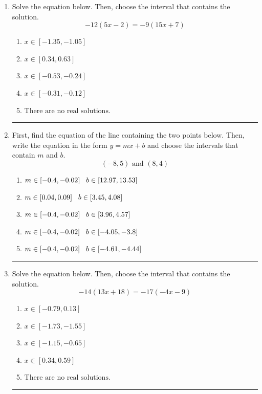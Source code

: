 \documentclass[14pt]{extbook}
\newcommand{\litem}[1]{\item#1\hspace*{-1cm}\rule{\textwidth}{0.4pt}}
\begin{document}
\begin{enumerate}
{\begin{enumerate}[label=\Alph*.]
\end{enumerate} }
\litem{
Solve the equation below. Then, choose the interval that contains the solution.\[ -12(5x -2) = -9(15x + 7) \]\begin{enumerate}[label=\Alph*.]
\item \( x \in [-1.35, -1.05] \)
\item \( x \in [0.34, 0.63] \)
\item \( x \in [-0.53, -0.24] \)
\item \( x \in [-0.31, -0.12] \)
\item \( \text{There are no real solutions.} \)

\end{enumerate} }
\litem{
First, find the equation of the line containing the two points below. Then, write the equation in the form $ y=mx+b $ and choose the intervals that contain $m$ and $b$.\[ (-8, 5) \text{ and } (8, 4) \]\begin{enumerate}[label=\Alph*.]
\item \( m \in [-0.4, -0.02] \hspace*{3mm} b \in [12.97, 13.53] \)
\item \( m \in [0.04, 0.09] \hspace*{3mm} b \in [3.45, 4.08] \)
\item \( m \in [-0.4, -0.02] \hspace*{3mm} b \in [3.96, 4.57] \)
\item \( m \in [-0.4, -0.02] \hspace*{3mm} b \in [-4.05, -3.8] \)
\item \( m \in [-0.4, -0.02] \hspace*{3mm} b \in [-4.61, -4.44] \)

\end{enumerate} }
\litem{
Solve the equation below. Then, choose the interval that contains the solution.\[ -14(13x + 18) = -17(-4x -9) \]\begin{enumerate}[label=\Alph*.]
\item \( x \in [-0.79, 0.13] \)
\item \( x \in [-1.73, -1.55] \)
\item \( x \in [-1.15, -0.65] \)
\item \( x \in [0.34, 0.59] \)
\item \( \text{There are no real solutions.} \)

\end{enumerate} }
\end{enumerate}
\end{document}
